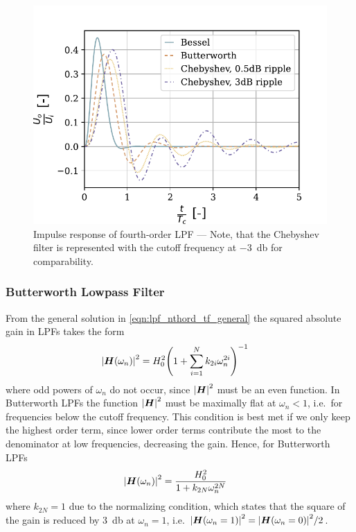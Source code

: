 \begin{figure}[!htb]
  \centering
  \includegraphics[scale=0.68]{figures/electronics/lowpass/lp_filter_4ord_imp}
  \caption[Impulse response of fourth-order \ac{LPF}]{Impulse response of fourth-order \ac{LPF} --- Note, that the Chebyshev filter is represented with the cutoff frequency at \SI{-3}{\decibel} for comparability.%
    \label{fig:lp_filter_4ord_imp}}
\end{figure}

\subsubsection{Butterworth Lowpass Filter}
From the general solution in \autoref{eqn:lpf_nthord_tf_general} the squared absolute gain in \ac{LPF}s takes the form
\begin{align}
  \abs{\vect{H}(\omega_n)}^2 &= H_0^2 \pqty{1 + \sum\limits_{i=1}^N k_{2i}\omega_n^{2i}}^{-1}
\end{align}
where odd powers of $\omega_n$ do not occur, since $\abs{\bm{H}}^2$ must be an even function. In Butterworth \ac{LPF}s the function $\abs{\bm{H}}^2$ must be maximally flat at $\omega_n < 1$, i.e.\ for frequencies below the cutoff frequency. This condition is best met if we only keep the highest order term, since lower order terms contribute the most to the denominator at low frequencies, decreasing the gain. Hence, for Butterworth \ac{LPF}s
\begin{align}
  \abs{\bm{H}(\omega_n)}^2 &= \frac{H_0^2}{1+k_{2N}\omega_n^{2N}} \label{eqn:butterwoth_gain_squared}
\end{align}
where $k_{2N}=1$ due to the normalizing condition, which states that the square of the gain is reduced by \SI{3}{\decibel} at $\omega_n=1$, i.e. $\abs{\bm{H}(\omega_n=1)}^2 = \abs{\bm{H}(\omega_n=0)}^2/2$.

